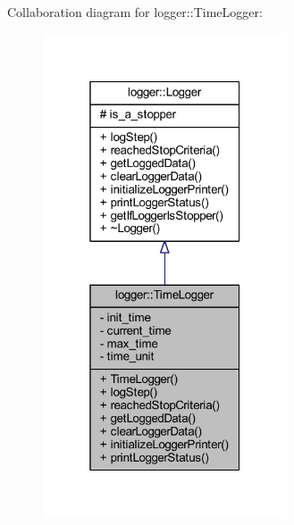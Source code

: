 Collaboration diagram for logger\+:\+:Time\+Logger\+:\nopagebreak
\begin{figure}[H]
\begin{center}
\leavevmode
\includegraphics[width=205pt]{classlogger_1_1_time_logger__coll__graph}
\end{center}
\end{figure}

